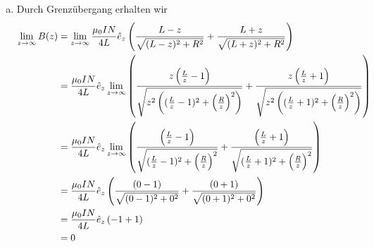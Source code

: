 \documentclass[a4paper,german,12pt,smallheadings]{scrartcl}
\begin{document}
\begin{enumerate}[a)]
\item Durch Grenzübergang erhalten wir
\begin{align*}
  \lim\limits_{z \to \infty} B(z)
  &=
  \lim\limits_{z \to \infty}
  \frac{\mu_0 I N}{4L} \hat{e}_z
  \del{
    \frac{L-z}{\sqrt{(L-z)^2 + R^2}}
    +\frac{L+z}{\sqrt{(L+z)^2 + R^2}}
  } \\
  &=
  \frac{\mu_0 I N}{4L} \hat{e}_z
  \lim\limits_{z \to \infty}
  \del{
    \frac{z\del{\frac{L}{z}-1}}{\sqrt{z^2 \del{(\frac{L}{z}-1)^2 + \del{\frac{R}{z}}^2}}}
    +
    \frac{z\del{\frac{L}{z}+1}}{\sqrt{z^2 \del{(\frac{L}{z}+1)^2 + \del{\frac{R}{z}}^2}}}
  } \\
  &=
  \frac{\mu_0 I N}{4L} \hat{e}_z
  \lim\limits_{z \to \infty}
  \del{
    \frac{\del{\frac{L}{z}-1}}{\sqrt{(\frac{L}{z}-1)^2 + \del{\frac{R}{z}}^2}}
    +
    \frac{\del{\frac{L}{z}+1}}{\sqrt{(\frac{L}{z}+1)^2 + \del{\frac{R}{z}}^2}}
  } \\
  &=
  \frac{\mu_0 I N}{4L} \hat{e}_z
  \del{
    \frac{\del{0-1}}{\sqrt{(0-1)^2 + 0^2}}
    +
    \frac{\del{0+1}}{\sqrt{(0+1)^2 + 0^2}}
  } \\
  &=
  \frac{\mu_0 I N}{4L} \hat{e}_z
  \del{
    -1 + 1
  } \\
  &= 0
\end{align*}
\end{enumerate}
\end{document}
